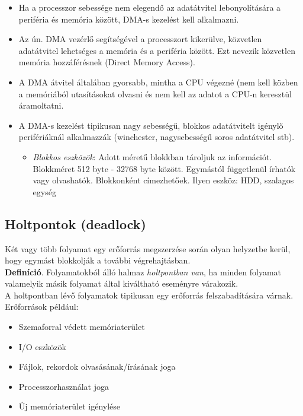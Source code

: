 \documentclass[tikz,12pt,margin=0px]{article}
\begin{document}
    \begin{itemize}[topsep=8pt,itemsep=4pt,partopsep=4pt, parsep=4pt]
        \item Ha a processzor sebessége nem elegendő az adatátvitel lebonyolítására a periféria és memória között, DMA-s kezelést kell alkalmazni.
        \item Az ún. DMA vezérlő segítségével a processzort kikerülve, közvetlen adatátvitel lehetséges a memória és a periféria között. Ezt nevezik közvetlen memória hozzáférésnek (Direct Memory Access).
        \item A DMA átvitel általában gyorsabb, mintha a CPU végezné (nem kell közben a memóriából utasításokat olvasni és nem kell az adatot a CPU-n keresztül áramoltatni.
        \item A DMA-s kezelést tipikusan nagy sebességű, blokkos adatátvitelt igénylő perifériáknál alkalmazzák (winchester, nagysebességű soros adatátvitel stb).
        	\begin{itemize}
                \item \textit{Blokkos eszközök}: Adott méretű blokkban tároljuk az információt. Blokkméret 512 byte - 32768 byte között. Egymástól függetlenül írhatók vagy olvashatók. Blokkonként címezhetőek. Ilyen eszköz: HDD, szalagos egység
	        \end{itemize}
    \end{itemize}
\newpage
	\subsection*{Holtpontok (deadlock)}
	
    Két vagy több folyamat egy erőforrás megszerzése során olyan helyzetbe kerül, hogy egymást blokkolják a további végrehajtásban.\\

    \noindent \textbf{Definíció}. Folyamatokból álló halmaz \emph{holtpontban van}, ha minden folyamat valamelyik másik folyamat által kiváltható eseményre várakozik.\\

    \noindent A holtpontban lévő folyamatok tipikusan egy erőforrás felszabadítására várnak.\\

    \noindent Erőforrások például:

    \begin{itemize}[topsep=8pt,itemsep=4pt,partopsep=4pt, parsep=4pt]
        \item Szemaforral védett memóriaterület
        \item I/O eszközök
        \item Fájlok, rekordok olvasásának/írásának joga
        \item Processzorhasználat joga
        \item Új memóriaterület igénylése
    \end{itemize}
\end{document}
